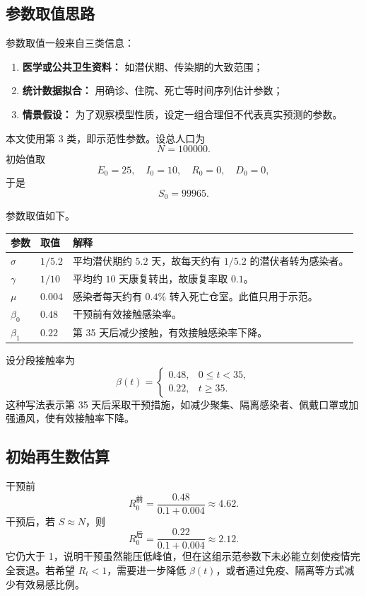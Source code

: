 \documentclass[UTF8,12pt,a4paper]{ctexart}
\begin{document}
\subsection{参数取值思路}
参数取值一般来自三类信息：
\begin{enumerate}[label=\arabic*.]
\item \textbf{医学或公共卫生资料：} 如潜伏期、传染期的大致范围；
\item \textbf{统计数据拟合：} 用确诊、住院、死亡等时间序列估计参数；
\item \textbf{情景假设：} 为了观察模型性质，设定一组合理但不代表真实预测的参数。
\end{enumerate}

本文使用第 3 类，即示范性参数。设总人口为
\[
N=100000.
\]
初始值取
\[
E_0=25,\quad I_0=10,\quad R_0=0,\quad D_0=0,
\]
于是
\[
S_0=99965.
\]

参数取值如下。
\begin{longtable}{p{2.6cm}p{4.0cm}p{8.2cm}}
\toprule
参数 & 取值 & 解释 \\
\midrule
$\sigma$ & $1/5.2$ & 平均潜伏期约 $5.2$ 天，故每天约有 $1/5.2$ 的潜伏者转为感染者。\\
$\gamma$ & $1/10$ & 平均约 $10$ 天康复转出，故康复率取 $0.1$。\\
$\mu$ & $0.004$ & 感染者每天约有 $0.4\%$ 转入死亡仓室。此值只用于示范。\\
$\beta_0$ & $0.48$ & 干预前有效接触感染率。\\
$\beta_1$ & $0.22$ & 第 35 天后减少接触，有效接触感染率下降。\\
\bottomrule
\end{longtable}

设分段接触率为
\[
\beta(t)=
\begin{cases}
0.48, & 0\le t<35,\\
0.22, & t\ge 35.
\end{cases}
\]
这种写法表示第 35 天后采取干预措施，如减少聚集、隔离感染者、佩戴口罩或加强通风，使有效接触率下降。

\subsection{初始再生数估算}
干预前
\[
R_0^{\text{前}}=\frac{0.48}{0.1+0.004}\approx4.62.
\]
干预后，若 $S\approx N$，则
\[
R_0^{\text{后}}=\frac{0.22}{0.1+0.004}\approx2.12.
\]
它仍大于 1，说明干预虽然能压低峰值，但在这组示范参数下未必能立刻使疫情完全衰退。若希望 $R_t<1$，需要进一步降低 $\beta(t)$，或者通过免疫、隔离等方式减少有效易感比例。
\end{document}
